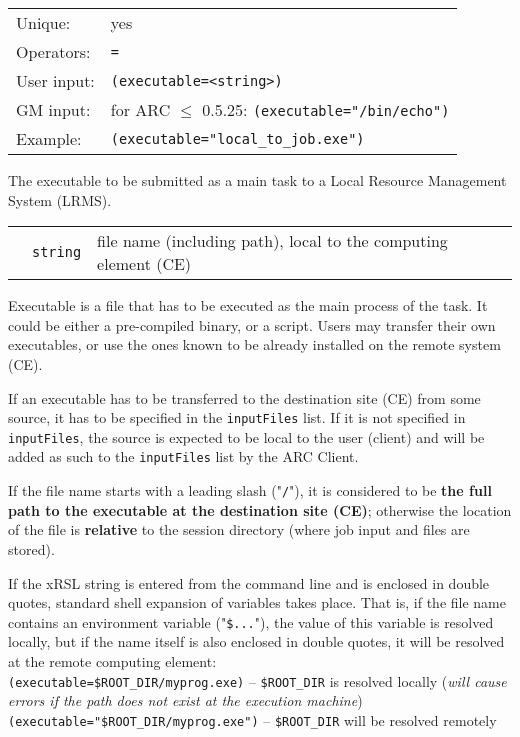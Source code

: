   \hspace*{0.5cm}
  \begin{shaded}
  \end{shaded}
  \begin{tabular}{lp{13cm}}
    Unique:&yes\\
    Operators:&\verb#=#\\
    User input:&\verb#(executable=<string>)#\\
    GM input:& for ARC $\leq$ 0.5.25:  \verb#(executable="/bin/echo")#\\
    Example:&\verb#(executable="local_to_job.exe")#\\
  \end{tabular}

  The executable to be submitted as a main task to a Local Resource
  Management System (LRMS).

  \begin{tabular}{llp{10cm}}
    \hspace*{1cm}&\texttt{string}&file name (including path), local to the computing
    element (CE)\\
  \end{tabular}

  Executable is a file that has to be executed as the main process
  of the task. It could be either a pre-compiled binary, or a
  script. Users may transfer their own executables, or use the ones
  known to be already installed on the remote system (CE).

  If an executable has to be transferred to the destination site (CE) from some source, it
  has to be specified in the \texttt{inputFiles} list. If it is not specified in \texttt{inputFiles},
  the source is expected to be local to the user (client) and
  will be added as such to the \texttt{inputFiles} list by the ARC Client.

  If the file name starts with a leading slash ("\verb#/#"), it is considered
  to be \textbf{the full path to the executable at the destination site (CE)}; otherwise
  the location of the file is \textbf{relative} to the session
  directory (where job input and files are stored). 

  If the xRSL string is entered from the command line and is enclosed
  in double quotes, standard shell expansion of variables takes place.
  That is, if the file name
  contains an environment variable ("\verb#$...#"), %
  the value of this variable is resolved locally, but if the name
  itself is also
  enclosed in double quotes, it will be resolved at the remote
  computing element:\\
  \verb#(executable=$ROOT_DIR/myprog.exe)# -- \verb#$ROOT_DIR# is resolved
  locally (\textit{will cause errors if the path does not exist at the
  execution machine})\\
  \verb#(executable="$ROOT_DIR/myprog.exe")# -- \verb#$ROOT_DIR# will be
  resolved remotely\\

